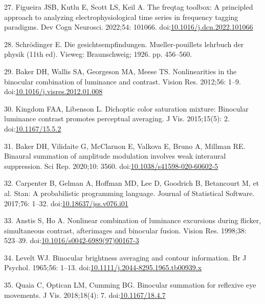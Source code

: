 \documentclass[
]{article}
\begin{document}
\leavevmode\hypertarget{ref-Figueira2022}{}%
27. Figueira JSB, Kutlu E, Scott LS, Keil A. The freqtag toolbox: A principled approach to analyzing electrophysiological time series in frequency tagging paradigms. Dev Cogn Neurosci. 2022;54: 101066. doi:\href{https://doi.org/10.1016/j.dcn.2022.101066}{10.1016/j.dcn.2022.101066}

\leavevmode\hypertarget{ref-Schrodinger1926}{}%
28. Schrödinger E. Die gesichtsempfindungen. Mueller-pouillets lehrbuch der physik (11th ed). Vieweg: Braunschweig; 1926. pp. 456--560.

\leavevmode\hypertarget{ref-Baker2012}{}%
29. Baker DH, Wallis SA, Georgeson MA, Meese TS. Nonlinearities in the binocular combination of luminance and contrast. Vision Res. 2012;56: 1--9. doi:\href{https://doi.org/10.1016/j.visres.2012.01.008}{10.1016/j.visres.2012.01.008}

\leavevmode\hypertarget{ref-Kingdom2015}{}%
30. Kingdom FAA, Libenson L. Dichoptic color saturation mixture: Binocular luminance contrast promotes perceptual averaging. J Vis. 2015;15(5): 2. doi:\href{https://doi.org/10.1167/15.5.2}{10.1167/15.5.2}

\leavevmode\hypertarget{ref-Baker2020}{}%
31. Baker DH, Vilidaite G, McClarnon E, Valkova E, Bruno A, Millman RE. Binaural summation of amplitude modulation involves weak interaural suppression. Sci Rep. 2020;10: 3560. doi:\href{https://doi.org/10.1038/s41598-020-60602-5}{10.1038/s41598-020-60602-5}

\leavevmode\hypertarget{ref-Carpenter2017}{}%
32. Carpenter B, Gelman A, Hoffman MD, Lee D, Goodrich B, Betancourt M, et al. Stan: A probabilistic programming language. Journal of Statistical Software. 2017;76: 1--32. doi:\href{https://doi.org/10.18637/jss.v076.i01}{10.18637/jss.v076.i01}

\leavevmode\hypertarget{ref-Anstis1998}{}%
33. Anstis S, Ho A. Nonlinear combination of luminance excursions during flicker, simultaneous contrast, afterimages and binocular fusion. Vision Res. 1998;38: 523--39. doi:\href{https://doi.org/10.1016/s0042-6989(97)00167-3}{10.1016/s0042-6989(97)00167-3}

\leavevmode\hypertarget{ref-Levelt1965}{}%
34. Levelt WJ. Binocular brightness averaging and contour information. Br J Psychol. 1965;56: 1--13. doi:\href{https://doi.org/10.1111/j.2044-8295.1965.tb00939.x}{10.1111/j.2044-8295.1965.tb00939.x}

\leavevmode\hypertarget{ref-Quaia2018}{}%
35. Quaia C, Optican LM, Cumming BG. Binocular summation for reflexive eye movements. J Vis. 2018;18(4): 7. doi:\href{https://doi.org/10.1167/18.4.7}{10.1167/18.4.7}
\end{document}
